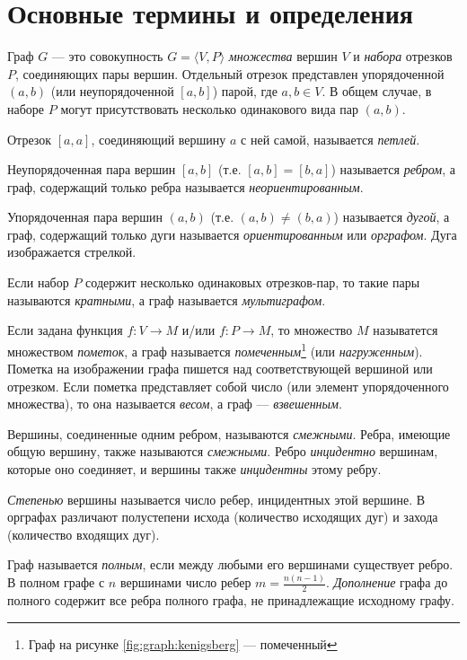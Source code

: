 \section{Основные термины и определения}

Граф $G$ --- это совокупность $G=\langle V,P\rangle$ \emph{множества} вершин $V$ и \emph{набора} отрезков $P$, соединяющих пары вершин. Отдельный отрезок представлен упорядоченной $(a,b)$ (или неупорядоченной $[a,b]$) парой, где $a,b\in V$. В общем случае, в наборе $P$ могут присутствовать несколько одинакового вида пар $(a,b)$.

Отрезок $[a,a]$, соединяющий вершину $a$ с ней самой, называется \emph{петлей}.

Неупорядоченная пара вершин $[a,b]$ (т.е. $[a,b]=[b,a]$) называется \emph{ребром}, а граф, содержащий только ребра называется \emph{неориентированным}.

Упорядоченная пара вершин $(a,b)$ (т.е. $(a,b)\neq(b,a)$) называется \emph{дугой}, а граф, содержащий только дуги называется \emph{ориентированным} или \emph{орграфом}. Дуга изображается стрелкой.

Если набор $P$ содержит несколько одинаковых отрезков-пар, то такие пары называются \emph{кратными}, а граф называется \emph{мультиграфом}.

Если задана функция $f:V\to M$ и/или $f:P\to M$, то множество $M$ называтется множеством \emph{пометок}, а граф называется \emph{помеченным}\footnote{Граф на рисунке \ref{fig:graph:kenigsberg} --- помеченный} (или \emph{нагруженным}). Пометка на изображении графа пишется над соответствующей вершиной или отрезком. Если пометка представляет собой число (или элемент упорядоченного множества), то она называется \emph{весом}, а граф --- \emph{взвешенным}.

Вершины, соединенные одним ребром, называются \emph{смежными}. Ребра, имеющие общую вершину, также называются \emph{смежными}. Ребро \emph{инцидентно} вершинам, которые оно соединяет, и вершины также \emph{инцидентны} этому ребру.

\emph{Степенью} вершины называется число ребер, инцидентных этой вершине. В орграфах различают полустепени исхода (количество исходящих дуг) и захода (количество входящих дуг).

Граф называется \emph{полным}, если между любыми его вершинами существует ребро. В полном графе с $n$ вершинами число ребер $m=\frac{n(n-1)}{2}$. \emph{Дополнение} графа до полного содержит все ребра полного графа, не принадлежащие исходному графу.

